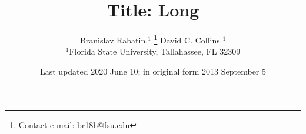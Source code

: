 
\title[Title: Short]{Title: Long}

\author[B. Rabatin et al.]{Branislav Rabatin,$^{1}$%
\thanks{Contact e-mail: \href{mailto:br18b@fsu.edu}{br18b@fsu.edu}}%
David C. Collins $^{1}$
\\
$^{1}$Florida State University, Tallahassee, FL 32309}

\date{Last updated 2020 June 10; in original form 2013 September 5}


